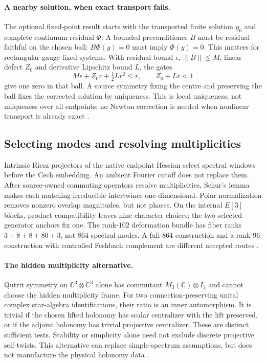\documentclass[11pt]{article}
\begin{document}
\paragraph{A nearby solution, when exact transport fails.}\label{sec:fsb03c}
The optional fixed-point result starts with the transported finite solution
$y_0$ and complete continuum residual $\Phi$. A bounded preconditioner $B$
must be residual-faithful on the chosen ball: $B\Phi(y)=0$ must imply
$\Phi(y)=0$. This matters for rectangular gauge-fixed systems. With residual
bound $\epsilon$, $\|B\|\leq M$, linear defect $Z_0$ and derivative
Lipschitz bound $L$, the gates
\[
 M\epsilon+Z_0r+\tfrac12Lr^2\leq r,\qquad Z_0+Lr<1
\]
give one zero in that ball. A source symmetry fixing the centre and preserving
the ball fixes the corrected solution by uniqueness. This is local uniqueness,
not uniqueness over all endpoints; no Newton correction is needed when
nonlinear transport is already exact \cite{FSB03c}.

\subsection{Selecting modes and resolving multiplicities}
\label{sec:fsb03d}
Intrinsic Riesz projectors of the native endpoint Hessian select spectral
windows before the Cech embedding. An ambient Fourier cutoff does not replace
them. After source-owned commuting operators resolve multiplicities, Schur's
lemma makes each matching irreducible intertwiner one-dimensional. Polar
normalization removes nonzero overlap magnitudes, but not phases. On the
internal $E[3]$ blocks, product compatibility leaves nine character choices;
the two selected generator anchors fix one. The rank-$102$ deformation
bundle has fiber ranks $3+8+8+80+3$, not $864$ spectral modes. A full-$864$
construction and a rank-$96$ construction with controlled Feshbach complement
are different accepted routes \cite{FSB03d}.

\paragraph{The hidden multiplicity alternative.}\label{sec:fsb03e}
Qutrit symmetry on $\mathbb C^3\otimes\mathbb C^3$ alone has commutant
$M_3(\mathbb C)\otimes I_3$ and cannot choose the hidden multiplicity frame.
For two connection-preserving unital complex star-algebra identifications,
their ratio is an inner automorphism. It is trivial if the chosen lifted
holonomy has scalar centralizer with the lift preserved, or if the adjoint
holonomy has trivial projective centralizer. These are distinct sufficient
tests. Stability or simplicity alone need not exclude discrete projective
self-twists. This alternative can replace simple-spectrum assumptions, but
does not manufacture the physical holonomy data \cite{FSB03e}.
\end{document}
